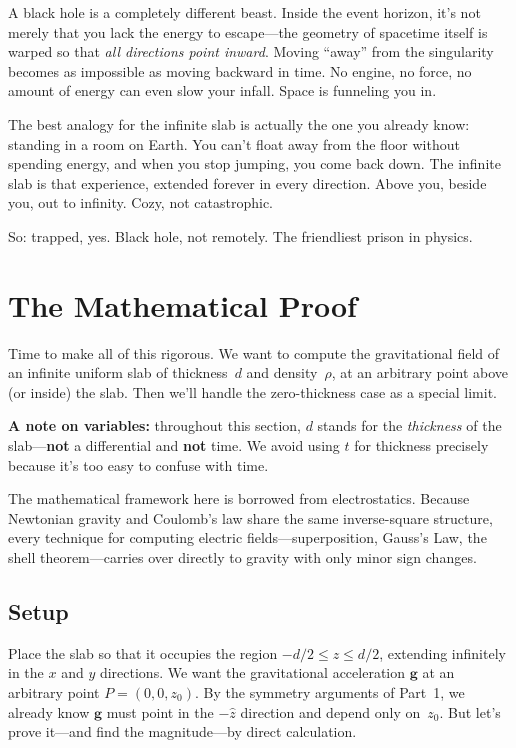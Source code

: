 \documentclass[11pt, letterpaper]{article}
\begin{document}
A black hole is a completely different beast. Inside the event horizon, it's not merely that you lack the energy to escape---the geometry of spacetime itself is warped so that \textit{all directions point inward}. Moving ``away'' from the singularity becomes as impossible as moving backward in time. No engine, no force, no amount of energy can even slow your infall. Space is funneling you in.

The best analogy for the infinite slab is actually the one you already know: standing in a room on Earth. You can't float away from the floor without spending energy, and when you stop jumping, you come back down. The infinite slab is that experience, extended forever in every direction. Above you, beside you, out to infinity. Cozy, not catastrophic.

So: trapped, yes. Black hole, not remotely. The friendliest prison in physics.

\newpage


\section{The Mathematical Proof}

Time to make all of this rigorous. We want to compute the gravitational field of an infinite uniform slab of thickness~$d$ and density~$\rho$, at an arbitrary point above (or inside) the slab. Then we'll handle the zero-thickness case as a special limit.

\textbf{A note on variables:} throughout this section, $d$ stands for the \textit{thickness} of the slab---\textbf{not} a differential and \textbf{not} time. We avoid using $t$ for thickness precisely because it's too easy to confuse with time.

The mathematical framework here is borrowed from electrostatics. Because Newtonian gravity and Coulomb's law share the same inverse-square structure, every technique for computing electric fields---superposition, Gauss's Law, the shell theorem---carries over directly to gravity with only minor sign changes.

\subsection{Setup}

Place the slab so that it occupies the region $-d/2 \leq z \leq d/2$, extending infinitely in the $x$ and $y$ directions. We want the gravitational acceleration $\mathbf{g}$ at an arbitrary point $P = (0, 0, z_0)$. By the symmetry arguments of Part~1, we already know $\mathbf{g}$ must point in the $-\hat{z}$ direction and depend only on~$z_0$. But let's prove it---and find the magnitude---by direct calculation.
\end{document}
